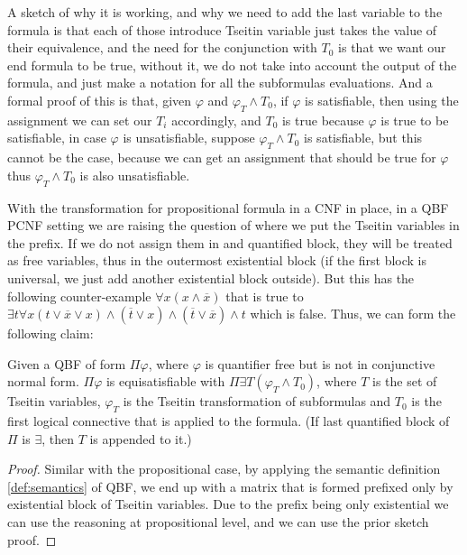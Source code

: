 A sketch of why it is working, and why we need to add the last variable to the formula is that each of those introduce Tseitin variable just takes the value of their equivalence, and the need for the conjunction with $T_0$ is that we want our end formula to be true, without it, we do not take into account the output of the formula, and just make a notation for all the subformulas evaluations. And a formal proof of this is that, given $\varphi$ and $\varphi_T \land T_0$, if $\varphi$ is satisfiable, then using the assignment we can set our $T_i$ accordingly, and $T_0$ is true because $\varphi$ is true to be satisfiable, in case $\varphi$ is unsatisfiable, suppose $\varphi_T \land T_0$ is satisfiable, but this cannot be the case, because we can get an assignment that should be true for $\varphi$ thus $\varphi_T \land T_0$ is also unsatisfiable.

With the transformation for propositional formula in a CNF in place, in a QBF PCNF setting we are raising the question of where we put the Tseitin variables in the prefix. If we do not assign them in and quantified block, they will be treated as free variables, thus in the outermost existential block (if the first block is universal, we just add another existential block outside). But this has the following counter-example $\forall x (x \land \overline{x})$ that is true to $\exists t \forall x (t \lor \overline{x} \lor x) \land (\overline{t} \lor x) \land (\overline{t} \lor \overline{x}) \land t$ which is false. Thus, we can form the following claim:

\begin{claim}
    Given a QBF of form $\Pi\varphi$, where $\varphi$ is quantifier free but is not in conjunctive normal form. $\Pi\varphi$ is equisatisfiable with $\Pi \exists T (\varphi_T \land T_0)$, where $T$ is the set of Tseitin variables, $\varphi_T$ is the Tseitin transformation of subformulas and $T_0$ is the first logical connective that is applied to the formula. (If last quantified block of $\Pi$ is $\exists$, then $T$ is appended to it.)
\end{claim}

\begin{proof}
    Similar with the propositional case, by applying the semantic definition \ref{def:semantics} of QBF, we end up with a matrix that is formed prefixed only by existential block of Tseitin variables. Due to the prefix being only existential we can use the reasoning at propositional level, and we can use the prior sketch proof.
\end{proof}